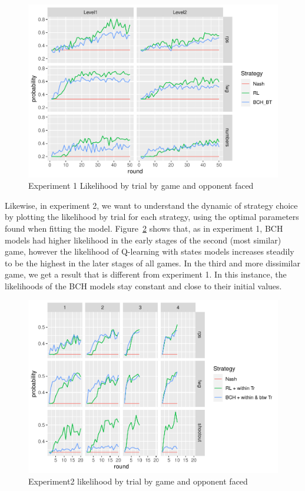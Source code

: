 \documentclass[man,floatsintext]{apa6}
\begin{document}
\begin{figure}

{\centering \includegraphics{paper_draft_2021_files/figure-latex/exp1-lik-by-tr-1} 

}

\caption{Experiment 1 Likelihood by trial by game and opponent faced}\label{fig:exp1-lik-by-tr}
\end{figure}

Likewise, in experiment 2, we want to understand the dynamic of strategy choice by plotting the likelihood by trial for each strategy, using the optimal parameters found when fitting the model. Figure~\ref{fig:exp2-lik-by-tr} shows that, as in experiment 1, BCH models had higher likelihood in the early stages of the second (most similar) game, however the likelihood of Q-learning with states models increases steadily to be the highest in the later stages of all games. In the third and more dissimilar game, we get a result that is different from experiment 1. In this instance, the likelihoods of the BCH models stay constant and close to their initial values.

\begin{figure}

{\centering \includegraphics{paper_draft_2021_files/figure-latex/exp2-lik-by-tr-1} 

}

\caption{Experiment2 likelihood by trial by game and opponent faced}\label{fig:exp2-lik-by-tr}
\end{figure}
\end{document}
